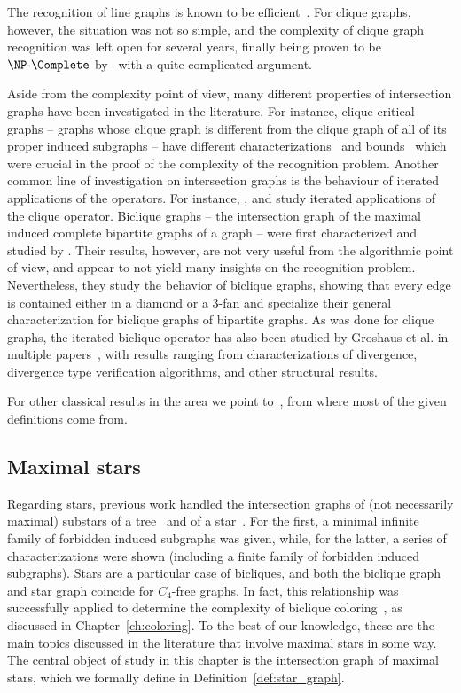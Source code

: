 The recognition of line graphs is known to be efficient~\citep{line_dynamic,line_nich,line_naor}.
For clique graphs, however, the situation was not so simple, and the complexity of clique graph recognition was left open for several years, finally being proven to be $\NPc$ by~\cite{clique_recognition} with a quite complicated argument.

Aside from the complexity point of view, many different properties of intersection graphs have been investigated in the literature.
For instance, clique-critical graphs -- graphs whose clique graph is different from the clique graph of all of its proper induced subgraphs -- have different characterizations~\citep{clique_critical_toft} and bounds~\citep{clique_critical_alcon} which were crucial in the proof of the complexity of the recognition problem.
Another common line of investigation on intersection graphs is the behaviour of iterated applications of the operators.
For instance, \cite{clique_iterated}, and \cite{clique_divergent} study iterated applications of the clique operator.
Biclique graphs -- the intersection graph of the maximal induced complete bipartite graphs of a graph -- were first characterized and studied by \cite{biclique_graph}.
Their results, however, are not very useful from the algorithmic point of view, and appear to not yield many insights on the recognition problem.
Nevertheless, they study the behavior of biclique graphs, showing that every edge is contained either in a diamond or a 3-fan and specialize their general characterization for biclique graphs of bipartite graphs.
As was done for clique graphs, the iterated biclique operator has also been studied by Groshaus et al. in multiple papers~\citep{biclique_iterated, almost_all_biclique}, with results ranging from characterizations of divergence, divergence type verification algorithms, and other structural results.

For other classical results in the area we point to~\citep{intersection_graphs}, from where most of the given definitions come from.

\subsection{Maximal stars}
\label{sec:maximal_stars}

Regarding stars, previous work handled the intersection graphs of (not necessarily maximal) substars of a tree~\citep{substar_graph} and of a star~\citep{starlike_graph}.
For the first, a minimal infinite family of forbidden induced subgraphs was given, while, for the latter, a series of characterizations were shown (including a finite family of forbidden induced subgraphs).
Stars are a particular case of bicliques, and both the biclique graph and star graph coincide for $C_4$-free graphs.
In fact, this relationship was successfully applied to determine the complexity of biclique coloring~\citep{biclique_coloring_complexity}, as discussed in Chapter~\ref{ch:coloring}.
To the best of our knowledge, these are the main topics discussed in the literature that involve maximal stars in some way.
The central object of study in this chapter is the intersection graph of maximal stars, which we formally define in Definition~\ref{def:star_graph}.


